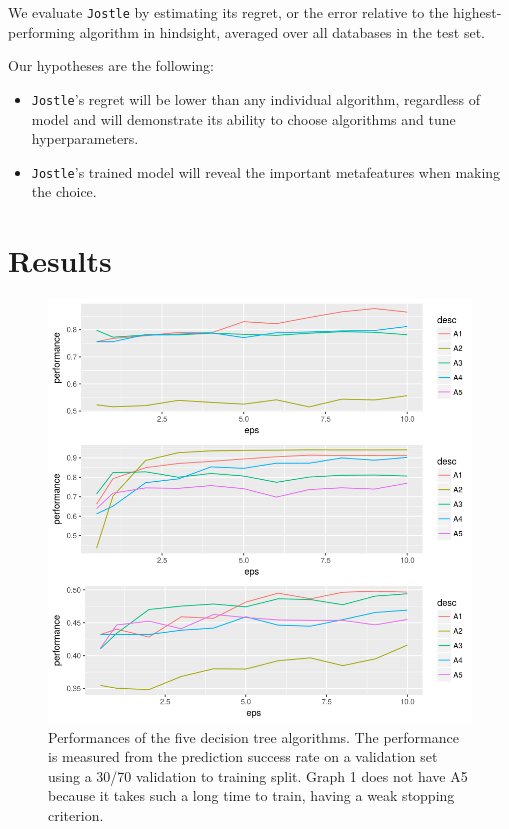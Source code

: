 \documentclass[11pt]{report}
\newcommand{\Jostle}{\texttt{Jostle}}
\begin{document}
We evaluate \Jostle{} by estimating its regret, or the error relative to the highest-performing algorithm in hindsight, averaged over all databases in the test set.

Our hypotheses are the following:
\begin{itemize}
\item \Jostle{}'s regret will be lower than any individual algorithm, regardless of model and will demonstrate its ability to choose algorithms and tune hyperparameters.
\item \Jostle{}'s trained model will reveal the important metafeatures when making the choice.
\end{itemize}
\section{Results}

\begin{figure}
\begin{center}
\includegraphics[scale=0.7]{Graph_Performances}
\end{center}
\caption{Performances of the five decision tree algorithms. The performance is measured from the prediction success rate on a validation set using a 30/70 validation to training split. Graph 1 does not have A5 because it takes such a long time to train, having a weak stopping criterion.}
\label{fig:datadep}
\end{figure}
\end{document}
